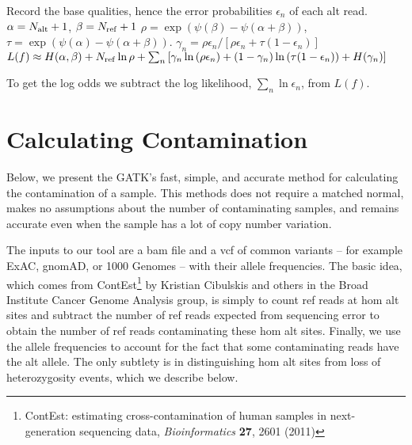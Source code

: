 \documentclass[nofootinbib,amssymb,amsmath]{revtex4}
\begin{document}
\begin{algorithm}
\begin{algorithmic}[1]
\State Record the base qualities, hence the error probabilities $\epsilon_n$ of each alt read.
\State $\alpha = N_{\rm alt} + 1$, $\beta = N_{\rm ref} + 1$
\State $\rho = \exp \left( \psi(\beta) - \psi(\alpha + \beta) \right) $, $\tau = \exp \left( \psi(\alpha) - \psi(\alpha + \beta) \right)$.
\State $\gamma_n =  \rho \epsilon_n / \left[ \rho \epsilon_n + \tau (1 - \epsilon_n) \right]$
\State $L(f) \approx H(\alpha, \beta) + N_{\rm ref} \ln \rho + \sum_n \left[ \gamma_n \ln \left( \rho \epsilon_n \right) + (1 - \gamma_n)\ln \left( \tau (1 - \epsilon_n) \right) + H(\gamma_n) \right]$
\end{algorithmic}
\end{algorithm}
To get the log odds we subtract the log likelihood, $\sum_n \ln \epsilon_n$, from $L(f)$.



\section{Calculating Contamination}
Below, we present the GATK's fast, simple, and accurate method for calculating the contamination of a sample.  This methods does not require a matched normal, makes no assumptions about the number of contaminating samples, and remains accurate even when the sample has a lot of copy number variation.

The inputs to our tool are a bam file and a vcf of common variants -- for example ExAC, gnomAD, or 1000 Genomes -- with their allele frequencies.  The basic idea, which comes from ContEst\footnote{ContEst: estimating cross-contamination of human samples in next-generation sequencing data, \textit{Bioinformatics} \textbf{27}, 2601 (2011)} by Kristian Cibulskis and others in the Broad Institute Cancer Genome Analysis group, is simply to count ref reads at hom alt sites and subtract the number of ref reads expected from sequencing error to obtain the number of ref reads contaminating these hom alt sites.  Finally, we use the allele frequencies to account for the fact that some contaminating reads have the alt allele.  The only subtlety is in distinguishing hom alt sites from loss of heterozygosity events, which we describe below.
\end{document}
